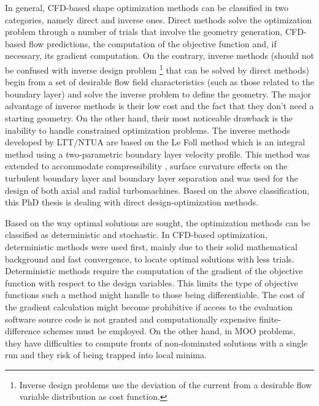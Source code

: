 In general, CFD-based shape optimization methods can be classified in two categories, namely direct and inverse ones. Direct methods \cite{phd_Giotis,phd_Kampolis,phd:papadim,kn:Emm2002,kn:Emm2004} solve the optimization problem through a number of trials that involve the geometry generation, CFD-based flow predictions, the computation of the objective function and, if necessary, its gradient computation.  On the contrary, inverse methods (should not be confused with inverse design problem \footnote{Inverse design problems use the deviation of the current from a desirable flow variable distribution as cost function.} that can be solved by direct methods) \cite{chav:95,ded:95} begin from a set of desirable flow field characteristics (such as those related to the boundary layer) and solve the inverse problem to define the geometry. The major advantage of inverse methods is their low cost and the fact that they don't need a starting geometry. On the other hand, their most noticeable drawback is the inability to handle constrained optimization problems. The inverse methods developed by LTT/NTUA are based on the Le Foll method \cite{lefoll} which is an integral method using a two-parametric boundary layer velocity profile. This method was extended to accommodate compressibility \cite{pap69}, surface curvature effects on the turbulent boundary layer \cite{pap70} and boundary layer separation \cite{pap81} and was used for the design of both axial and radial turbomachines. Based on the above classification, this PhD thesis is dealing with direct design-optimization methods.  

Based on the way optimal solutions are sought, the optimization methods can be classified as deterministic and stochastic. In CFD-based optimization, deterministic methods were used first,  mainly due to their solid mathematical background and fast convergence, to locate optimal solutions with less trials. Deterministic methods require the computation of the gradient of the objective function with respect to the design variables. This limits the type of objective functions such a method might handle to those being differentiable. The cost of the gradient calculation might become prohibitive if access to the evaluation software source code is not granted and computationally expensive finite-difference schemes must be employed. On the other hand, in MOO problems, they have difficulties to compute fronts of non-dominated solutions with a single run and they risk of being trapped into local minima.        

